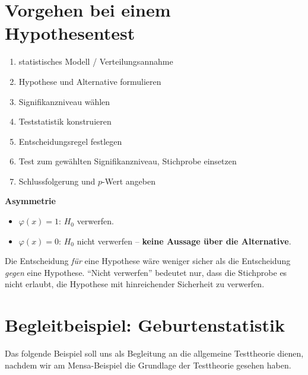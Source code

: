 
\section{Vorgehen bei einem Hypothesentest}\label{sec:vorgehen-hypothesentest}

\begin{enumerate}
    \item statistisches Modell / Verteilungsannahme
    \item Hypothese und Alternative formulieren
    \item Signifikanzniveau wählen
    \item Teststatistik konstruieren
    \item Entscheidungsregel festlegen
    \item Test zum gewählten Signifikanzniveau, Stichprobe einsetzen
    \item Schlussfolgerung und $p$-Wert angeben
\end{enumerate}

\begin{bem}
    \textbf{Asymmetrie}  \\
    \begin{itemize}
        \item $\varphi(x)=1$: $H_0$ verwerfen.
        \item $\varphi(x)=0$: $H_0$ nicht verwerfen -- \textbf{keine Aussage über die Alternative}.
    \end{itemize}
    Die Entscheidung \emph{für} eine Hypothese wäre weniger sicher als die Entscheidung \emph{gegen} eine
    Hypothese.
    ``Nicht verwerfen'' bedeutet nur, dass die Stichprobe es nicht erlaubt, die Hypothese mit
    hinreichender Sicherheit zu verwerfen.
\end{bem}


\section*{Begleitbeispiel: Geburtenstatistik}\label{sec:begleitbeispiel-geburtenstatistik}

Das folgende Beispiel soll uns als Begleitung an die allgemeine Testtheorie dienen, nachdem wir am Mensa-Beispiel
die Grundlage der Testtheorie gesehen haben.

